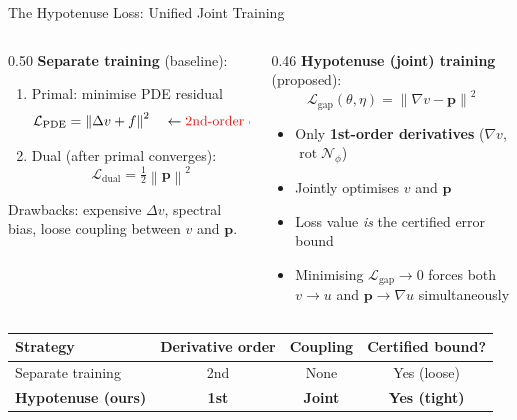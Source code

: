 \documentclass[10pt,aspectratio=169]{beamer}
\DeclareMathOperator{\rot}{rot}
\newcommand{\norm}[1]{\left\|#1\right\|}
\begin{document}
\begin{frame}{The Hypotenuse Loss: Unified Joint Training}

  \begin{columns}[T]
    \begin{column}{0.50\textwidth}
      \textbf{Separate training} (baseline):
      \begin{enumerate}
        \item Primal: minimise PDE residual
          \[
            \mathcal{L}_{\text{PDE}} = \norm{\Delta v + f}^2
            \quad \leftarrow \textcolor{red}{\text{2nd-order derivatives!}}
          \]
        \item Dual (after primal converges):
          \[
            \mathcal{L}_{\text{dual}} = \tfrac{1}{2}\norm{\mathbf{p}}^2
          \]
      \end{enumerate}
      \medskip
      Drawbacks: expensive $\Delta v$, spectral bias,
      loose coupling between $v$ and $\mathbf{p}$.
    \end{column}
    \begin{column}{0.46\textwidth}
      \textbf{Hypotenuse (joint) training} (proposed):
      \[
        \boxed{\mathcal{L}_{\text{gap}}(\theta,\eta)
          = \norm{\nabla v - \mathbf{p}}^2}
      \]
      \begin{itemize}
        \item Only \textbf{1st-order derivatives}
              ($\nabla v$, $\rot\mathcal{N}_\phi$)
        \item Jointly optimises $v$ and $\mathbf{p}$
        \item Loss value \emph{is} the certified error
              bound
        \item Minimising $\mathcal{L}_{\text{gap}} \to 0$
              forces both
              $v \to u$ and $\mathbf{p} \to \nabla u$
              simultaneously
      \end{itemize}
    \end{column}
  \end{columns}

  \bigskip
  \begin{center}
  \small
  \begin{tabular}{lccc}
    \toprule
    Strategy & Derivative order & Coupling & Certified bound? \\
    \midrule
    Separate training    & 2nd & None & Yes (loose) \\
    \textbf{Hypotenuse (ours)} & \textbf{1st} & \textbf{Joint} & \textbf{Yes (tight)} \\
    \bottomrule
  \end{tabular}
  \end{center}
\end{frame}
\end{document}
